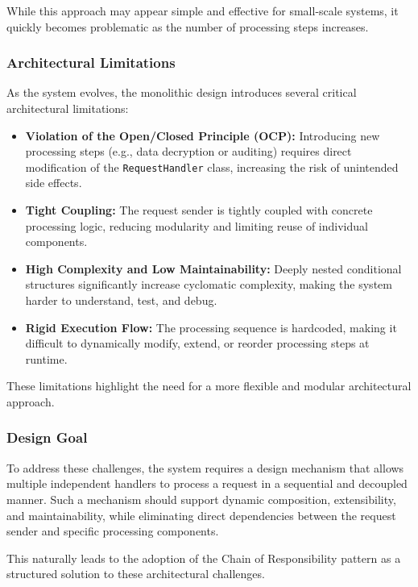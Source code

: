 While this approach may appear simple and effective for small-scale systems, it quickly becomes problematic as the number of processing steps increases.

\subsubsection{Architectural Limitations}
As the system evolves, the monolithic design introduces several critical architectural limitations:

\begin{itemize}
    \item \textbf{Violation of the Open/Closed Principle (OCP):} Introducing new processing steps (e.g., data decryption or auditing) requires direct modification of the \texttt{RequestHandler} class, increasing the risk of unintended side effects.
    
    \item \textbf{Tight Coupling:} The request sender is tightly coupled with concrete processing logic, reducing modularity and limiting reuse of individual components.
    
    \item \textbf{High Complexity and Low Maintainability:} Deeply nested conditional structures significantly increase cyclomatic complexity, making the system harder to understand, test, and debug.
    
    \item \textbf{Rigid Execution Flow:} The processing sequence is hardcoded, making it difficult to dynamically modify, extend, or reorder processing steps at runtime.
\end{itemize}

These limitations highlight the need for a more flexible and modular architectural approach.

\subsubsection{Design Goal}
To address these challenges, the system requires a design mechanism that allows multiple independent handlers to process a request in a sequential and decoupled manner. Such a mechanism should support dynamic composition, extensibility, and maintainability, while eliminating direct dependencies between the request sender and specific processing components.

This naturally leads to the adoption of the Chain of Responsibility pattern as a structured solution to these architectural challenges.